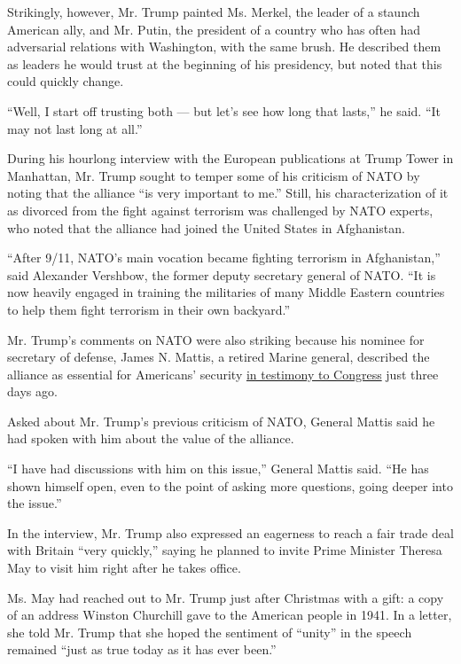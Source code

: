 Strikingly, however, Mr. Trump painted Ms. Merkel, the leader of a
staunch American ally, and Mr. Putin, the president of a country who has
often had adversarial relations with Washington, with the same brush. He
described them as leaders he would trust at the beginning of his
presidency, but noted that this could quickly change.

``Well, I start off trusting both --- but let's see how long that
lasts,'' he said. ``It may not last long at all.''

During his hourlong interview with the European publications at Trump
Tower in Manhattan, Mr. Trump sought to temper some of his criticism of
NATO by noting that the alliance ``is very important to me.'' Still, his
characterization of it as divorced from the fight against terrorism was
challenged by NATO experts, who noted that the alliance had joined the
United States in Afghanistan.

``After 9/11, NATO's main vocation became fighting terrorism in
Afghanistan,'' said Alexander Vershbow, the former deputy secretary
general of NATO. ``It is now heavily engaged in training the militaries
of many Middle Eastern countries to help them fight terrorism in their
own backyard.''

Mr. Trump's comments on NATO were also striking because his nominee for
secretary of defense, James N. Mattis, a retired Marine general,
described the alliance as essential for Americans' security
\href{https://www.nytimes.com/2017/01/12/us/politics/james-mattis-defense-secretary-nominee.html}{in
testimony to Congress} just three days ago.

Asked about Mr. Trump's previous criticism of NATO, General Mattis said
he had spoken with him about the value of the alliance.

``I have had discussions with him on this issue,'' General Mattis said.
``He has shown himself open, even to the point of asking more questions,
going deeper into the issue.''

In the interview, Mr. Trump also expressed an eagerness to reach a fair
trade deal with Britain ``very quickly,'' saying he planned to invite
Prime Minister Theresa May to visit him right after he takes office.

Ms. May had reached out to Mr. Trump just after Christmas with a gift: a
copy of an address Winston Churchill gave to the American people in
1941. In a letter, she told Mr. Trump that she hoped the sentiment of
``unity'' in the speech remained ``just as true today as it has ever
been.''

